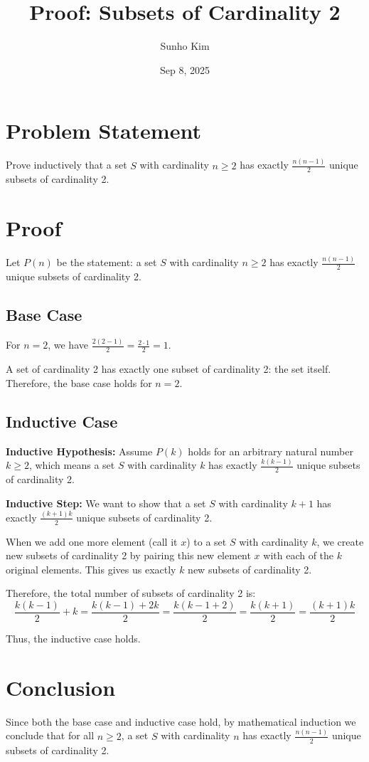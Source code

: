 \documentclass{article}
\title{Proof: Subsets of Cardinality 2}
\author{Sunho Kim}
\date{Sep 8, 2025}
\begin{document}
\maketitle

\section{Problem Statement}
Prove inductively that a set $S$ with cardinality $n \geq 2$ has exactly $\frac{n(n-1)}{2}$ unique subsets of cardinality 2.

\section{Proof}

Let $P(n)$ be the statement: a set $S$ with cardinality $n \geq 2$ has exactly $\frac{n(n-1)}{2}$ unique subsets of cardinality 2.

\subsection{Base Case}
For $n = 2$, we have $\frac{2(2-1)}{2} = \frac{2 \cdot 1}{2} = 1$. 

A set of cardinality 2 has exactly one subset of cardinality 2: the set itself. Therefore, the base case holds for $n = 2$.

\subsection{Inductive Case}
\textbf{Inductive Hypothesis:} Assume $P(k)$ holds for an arbitrary natural number $k \geq 2$, which means a set $S$ with cardinality $k$ has exactly $\frac{k(k-1)}{2}$ unique subsets of cardinality 2.

\textbf{Inductive Step:} We want to show that a set $S$ with cardinality $k+1$ has exactly $\frac{(k+1)k}{2}$ unique subsets of cardinality 2.

When we add one more element (call it $x$) to a set $S$ with cardinality $k$, we create new subsets of cardinality 2 by pairing this new element $x$ with each of the $k$ original elements. This gives us exactly $k$ new subsets of cardinality 2.

Therefore, the total number of subsets of cardinality 2 is:
$$\frac{k(k-1)}{2} + k = \frac{k(k-1) + 2k}{2} = \frac{k(k-1+2)}{2} = \frac{k(k+1)}{2} = \frac{(k+1)k}{2}$$

Thus, the inductive case holds.

\section{Conclusion}
Since both the base case and inductive case hold, by mathematical induction we conclude that for all $n \geq 2$, a set $S$ with cardinality $n$ has exactly $\frac{n(n-1)}{2}$ unique subsets of cardinality 2.
\end{document}
